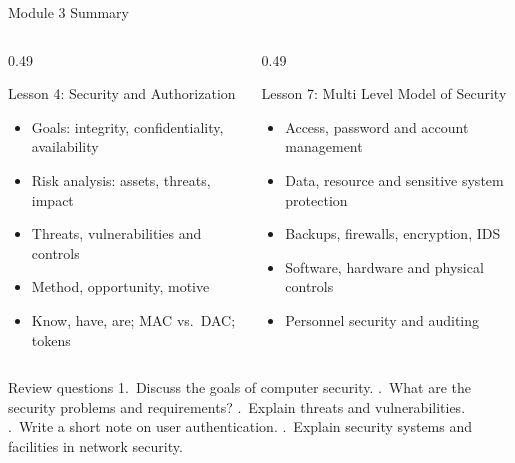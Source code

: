 \documentclass[aspectratio=169,11pt,xcolor={table}]{beamer}
\begin{document}
\begin{frame}{Module 3 Summary}
  \begin{columns}[T]
    \begin{column}{0.49\textwidth}
      \begin{block}{Lesson 4: Security and Authorization}
        \small
        \begin{itemize}\setlength{\itemsep}{0pt}
          \item Goals: integrity, confidentiality, availability
          \item Risk analysis: assets, threats, impact
          \item Threats, vulnerabilities and controls
          \item Method, opportunity, motive
          \item Know, have, are; MAC vs.\ DAC; tokens
        \end{itemize}
      \end{block}
    \end{column}
    \begin{column}{0.49\textwidth}
      \begin{exampleblock}{Lesson 7: Multi Level Model of Security}
        \small
        \begin{itemize}\setlength{\itemsep}{0pt}
          \item Access, password and account management
          \item Data, resource and sensitive system protection
          \item Backups, firewalls, encryption, IDS
          \item Software, hardware and physical controls
          \item Personnel security and auditing
        \end{itemize}
      \end{exampleblock}
    \end{column}
  \end{columns}
  \vspace{1mm}
  \begin{alertblock}{Review questions}
    \scriptsize
    1.~Discuss the goals of computer security. .~What are the security problems and requirements? .~Explain threats and vulnerabilities. .~Write a short note on user authentication. .~Explain security systems and facilities in network security.
  \end{alertblock}
\end{frame}
\end{document}
